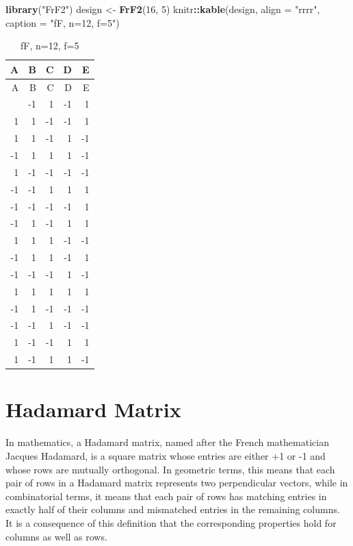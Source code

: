 \documentclass[
  12pt,
  a4paper,
]{article}
\newenvironment{Shaded}{\begin{snugshade}}{\end{snugshade}}
\newcommand{\AttributeTok}[1]{\textcolor[rgb]{0.13,0.29,0.53}{#1}}
\newcommand{\DecValTok}[1]{\textcolor[rgb]{0.00,0.00,0.81}{#1}}
\newcommand{\FunctionTok}[1]{\textcolor[rgb]{0.13,0.29,0.53}{\textbf{#1}}}
\newcommand{\NormalTok}[1]{#1}
\newcommand{\OtherTok}[1]{\textcolor[rgb]{0.56,0.35,0.01}{#1}}
\newcommand{\SpecialCharTok}[1]{\textcolor[rgb]{0.81,0.36,0.00}{\textbf{#1}}}
\newcommand{\StringTok}[1]{\textcolor[rgb]{0.31,0.60,0.02}{#1}}
\numberwithin{equation}{section}
\theoremstyle{plain}
\theoremstyle{definition}
\theoremstyle{remark}
\theoremstyle{note}
\begin{document}
\begin{Shaded}
\begin{Highlighting}[]
\FunctionTok{library}\NormalTok{(}\StringTok{"FrF2"}\NormalTok{)}
\NormalTok{design }\OtherTok{\textless{}{-}} \FunctionTok{FrF2}\NormalTok{(}\DecValTok{16}\NormalTok{, }\DecValTok{5}\NormalTok{)}
\NormalTok{knitr}\SpecialCharTok{::}\FunctionTok{kable}\NormalTok{(design, }\AttributeTok{align =} \StringTok{"rrrr"}\NormalTok{, }\AttributeTok{caption =} \StringTok{"fF, n=12, f=5"}\NormalTok{)}
\end{Highlighting}
\end{Shaded}

\begin{longtable}[]{@{}rrrrr@{}}
\caption{fF, n=12, f=5}\tabularnewline
\toprule\noalign{}
A & B & C & D & E \\
\midrule\noalign{}
\endfirsthead
\toprule\noalign{}
A & B & C & D & E \\
\midrule\noalign{}
\endhead
\bottomrule\noalign{}
\endlastfoot
1 & -1 & 1 & -1 & 1 \\
1 & 1 & -1 & -1 & 1 \\
1 & 1 & -1 & 1 & -1 \\
-1 & 1 & 1 & 1 & -1 \\
1 & -1 & -1 & -1 & -1 \\
-1 & -1 & 1 & 1 & 1 \\
-1 & -1 & -1 & -1 & 1 \\
-1 & 1 & -1 & 1 & 1 \\
1 & 1 & 1 & -1 & -1 \\
-1 & 1 & 1 & -1 & 1 \\
-1 & -1 & -1 & 1 & -1 \\
1 & 1 & 1 & 1 & 1 \\
-1 & 1 & -1 & -1 & -1 \\
-1 & -1 & 1 & -1 & -1 \\
1 & -1 & -1 & 1 & 1 \\
1 & -1 & 1 & 1 & -1 \\
\end{longtable}

\newpage

\hypertarget{hadamard-matrix}{%
\section{Hadamard Matrix}\label{hadamard-matrix}}

In mathematics, a Hadamard matrix, named after the French mathematician
Jacques Hadamard, is a square matrix whose entries are either +1 or -1
and whose rows are mutually orthogonal. In geometric terms, this means
that each pair of rows in a Hadamard matrix represents two perpendicular
vectors, while in combinatorial terms, it means that each pair of rows
has matching entries in exactly half of their columns and mismatched
entries in the remaining columns. It is a consequence of this definition
that the corresponding properties hold for columns as well as rows.
\end{document}
